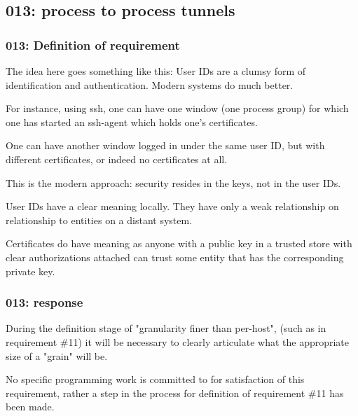\subsection{013: process to process tunnels}

\subsubsection{013: Definition of requirement }

The idea here goes something like this:  User IDs are a clumsy form of 
identification and authentication.  Modern systems do much better.  

For instance, using ssh, one can have one window (one process group) for
which one has started an ssh-agent which holds one's certificates.  

One can have another window logged in under the same user ID, but with
different certificates, or indeed no certificates at all.  

This is the modern approach:  security resides in the keys, not in the user IDs.

User IDs have a clear meaning locally.
They have only a weak relationship on relationship to entities on a distant
system.

Certificates do have meaning as anyone with a public key in a trusted store
with clear authorizations attached can trust some entity that has the 
corresponding private key.

\subsubsection{013: response}

During the definition stage of "granularity finer than per-host", (such as
in requirement \#11) it will be necessary to clearly articulate what the
appropriate size of a "grain" will be.

No specific programming work is committed to for satisfaction of this
requirement, rather a step in the process for definition of requirement \#11
has been made. 











